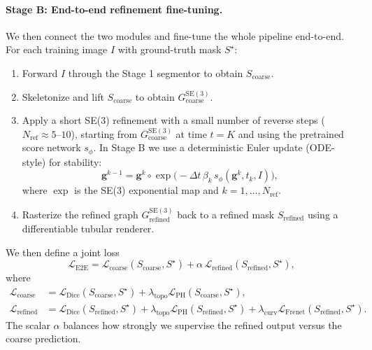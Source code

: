 \documentclass{article}
\newcommand{\SE}[1]{\mathrm{SE}(#1)}
\begin{document}
\paragraph{Stage B: End-to-end refinement fine-tuning.}
We then connect the two modules and fine-tune the whole pipeline end-to-end. For each training image $I$ with ground-truth mask $S^\star$:

\begin{enumerate}[leftmargin=*]
  \item Forward $I$ through the Stage 1 segmentor to obtain $S_{\text{coarse}}$.
  \item Skeletonize and lift $S_{\text{coarse}}$ to obtain $G^{\SE{3}}_{\text{coarse}}$.
  \item Apply a short SE(3) refinement with a small number of reverse steps ($N_{\text{ref}} \approx 5$--$10$), starting from $G^{\SE{3}}_{\text{coarse}}$ at time $t=K$ and using the pretrained score network $s_\phi$. In Stage B we use a deterministic Euler update (ODE-style) for stability:
  \begin{equation}
    \mathbf{g}^{k-1}
    = \mathbf{g}^{k} \circ \exp\big(-\Delta t \,\beta_k \, s_\phi(\mathbf{g}^k, t_k, I)\big),
  \end{equation}
  where $\exp$ is the SE(3) exponential map and $k = 1,\dots,N_{\text{ref}}$.
  \item Rasterize the refined graph $G^{\SE{3}}_{\text{refined}}$ back to a refined mask $S_{\text{refined}}$ using a differentiable tubular renderer.
\end{enumerate}

We then define a joint loss
\begin{equation}
  \mathcal{L}_{\text{E2E}} 
  = \mathcal{L}_{\text{coarse}}(S_{\text{coarse}}, S^\star)
  + \alpha\, \mathcal{L}_{\text{refined}}(S_{\text{refined}}, S^\star),
\end{equation}
where
\begin{align}
  \mathcal{L}_{\text{coarse}} &= 
    \mathcal{L}_{\text{Dice}}(S_{\text{coarse}}, S^\star)
    + \lambda_{\text{topo}}\mathcal{L}_{\text{PH}}(S_{\text{coarse}}, S^\star), \\
  \mathcal{L}_{\text{refined}} &= 
    \mathcal{L}_{\text{Dice}}(S_{\text{refined}}, S^\star)
    + \lambda_{\text{topo}}\mathcal{L}_{\text{PH}}(S_{\text{refined}}, S^\star)
    + \lambda_{\text{curv}}\mathcal{L}_{\text{Frenet}}(S_{\text{refined}}, S^\star).
\end{align}
The scalar $\alpha$ balances how strongly we supervise the refined output versus the coarse prediction.
\end{document}
